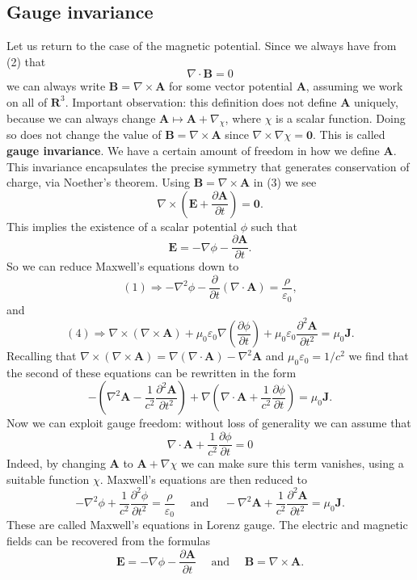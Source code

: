 \subsection{Gauge invariance}
Let us return to the case of the magnetic potential. Since we always have from (2) that
$$
    \nabla \cdot \mathbf{B}=0
$$
we can always write $\mathbf{B}=\nabla \times \mathbf{A}$ for some vector potential $\mathbf{A}$, assuming we work on all of $\mathbf{R}^{3}$. Important observation: this definition does not define $\mathbf{A}$ uniquely, because we can always change $ \mathbf{A} \mapsto \mathbf{A} + \nabla_\chi $, where $\chi$ is a scalar function. Doing so does not change the value of $\mathbf{B}=\nabla \times \mathbf{A}$ since $\nabla \times \nabla \chi=\mathbf{0}$. This is called \textbf{gauge invariance}. We have a certain amount of freedom in how we define $\mathbf{A}$. This invariance encapsulates the precise symmetry that generates conservation of charge, via Noether's theorem. Using $\mathbf{B}=\nabla \times \mathbf{A}$ in (3) we see
$$
    \nabla \times\left(\mathbf{E}+\frac{\partial \mathbf{A}}{\partial t}\right)=\mathbf{0}.
$$
This implies the existence of a scalar potential $\phi$ such that
$$
    \mathbf{E}=-\nabla \phi-\frac{\partial \mathbf{A}}{\partial t}.
$$
So we can reduce Maxwell's equations down to
$$
    (1) \Longrightarrow -\nabla^{2} \phi-\frac{\partial}{\partial t}(\nabla \cdot \mathbf{A})=\frac{\rho}{\varepsilon_{0}},
$$
and
$$
    (4) \Longrightarrow \nabla \times(\nabla \times \mathbf{A})+\mu_{0} \varepsilon_{0} \nabla\left(\frac{\partial \phi}{\partial t}\right)+\mu_{0} \varepsilon_{0} \frac{\partial^{2} \mathbf{A}}{\partial t^{2}}=\mu_{0} \mathbf{J}.
$$
Recalling that $\nabla \times(\nabla \times \mathbf{A})=\nabla(\nabla \cdot \mathbf{A})-\nabla^{2} \mathbf{A}$ and $\mu_{0} \varepsilon_{0}=1 / c^{2}$ we find that the second
of these equations can be rewritten in the form
$$
    -\left(\nabla^{2} \mathbf{A}-\frac{1}{c^{2}} \frac{\partial^{2} \mathbf{A}}{\partial t^{2}}\right)+\nabla\left(\nabla \cdot \mathbf{A}+\frac{1}{c^{2}} \frac{\partial \phi}{\partial t}\right)=\mu_{0} \mathbf{J}.
$$
Now we can exploit gauge freedom: without loss of generality we can assume that
\[
    \nabla \cdot \mathbf{A}+\frac{1}{c^{2}} \frac{\partial \phi}{\partial t}=0
\]
Indeed, by changing $\mathbf{A}$ to $\mathbf{A}+\nabla \chi$ we can make sure this term vanishes, using a suitable function $\chi$. Maxwell's equations are then reduced to
\[
    -\nabla^{2} \phi+\frac{1}{c^{2}} \frac{\partial^{2} \phi}{\partial t^{2}}=\frac{\rho}{\varepsilon_{0}} \quad \text { and } \quad-\nabla^{2} \mathbf{A}+\frac{1}{c^{2}} \frac{\partial^{2} \mathbf{A}}{\partial t^{2}}=\mu_{0} \mathbf{J}.
\]
These are called Maxwell's equations in Lorenz gauge. The electric and magnetic fields can be recovered from the formulas
\[
    \mathbf{E}=-\nabla \phi-\frac{\partial \mathbf{A}}{\partial t} \quad \text { and } \quad \mathbf{B}=\nabla \times \mathbf{A}.
\]
